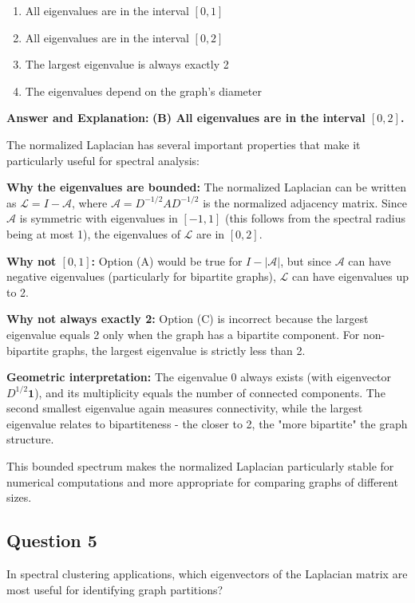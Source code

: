 \documentclass[11pt]{article}
\newenvironment{answer}{\color{answercolor}\begin{framed}\textbf{Answer and Explanation:}}{\end{framed}}
\begin{document}
\begin{enumerate}[label=(\Alph*)]
    \item All eigenvalues are in the interval $[0, 1]$
    \item All eigenvalues are in the interval $[0, 2]$
    \item The largest eigenvalue is always exactly 2
    \item The eigenvalues depend on the graph's diameter
\end{enumerate}

\begin{answer}
\textbf{(B) All eigenvalues are in the interval $[0, 2]$.}

The normalized Laplacian has several important properties that make it particularly useful for spectral analysis:

\textbf{Why the eigenvalues are bounded:}
The normalized Laplacian can be written as $\mathcal{L} = I - \mathcal{A}$, where $\mathcal{A} = D^{-1/2}AD^{-1/2}$ is the normalized adjacency matrix. Since $\mathcal{A}$ is symmetric with eigenvalues in $[-1, 1]$ (this follows from the spectral radius being at most 1), the eigenvalues of $\mathcal{L}$ are in $[0, 2]$.

\textbf{Why not $[0, 1]$:} 
Option (A) would be true for $I - |\mathcal{A}|$, but since $\mathcal{A}$ can have negative eigenvalues (particularly for bipartite graphs), $\mathcal{L}$ can have eigenvalues up to 2.

\textbf{Why not always exactly 2:}
Option (C) is incorrect because the largest eigenvalue equals 2 only when the graph has a bipartite component. For non-bipartite graphs, the largest eigenvalue is strictly less than 2.

\textbf{Geometric interpretation:}
The eigenvalue 0 always exists (with eigenvector $D^{1/2}\mathbf{1}$), and its multiplicity equals the number of connected components. The second smallest eigenvalue again measures connectivity, while the largest eigenvalue relates to bipartiteness - the closer to 2, the "more bipartite" the graph structure.

This bounded spectrum makes the normalized Laplacian particularly stable for numerical computations and more appropriate for comparing graphs of different sizes.
\end{answer}

\subsection{Question 5}
In spectral clustering applications, which eigenvectors of the Laplacian matrix are most useful for identifying graph partitions?
\end{document}
